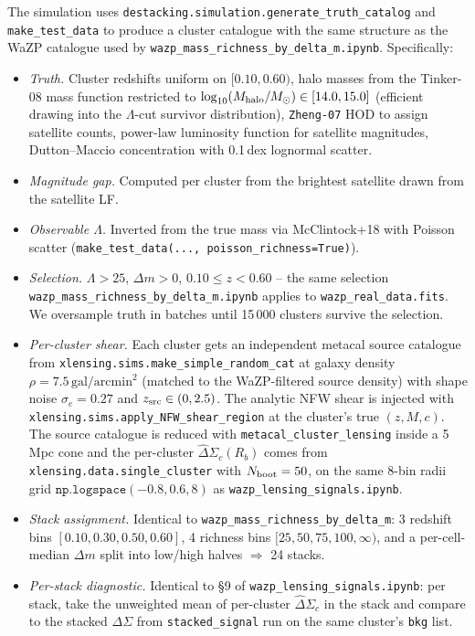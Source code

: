 \documentclass[11pt,a4paper]{article}
\newcommand{\DS}{\Delta\Sigma}
\newcommand{\Msun}{M_{\odot}}
\begin{document}
The simulation uses \verb|destacking.simulation.generate_truth_catalog|
and \verb|make_test_data| to produce a cluster catalogue with the same
structure as the WaZP catalogue used by
\verb|wazp_mass_richness_by_delta_m.ipynb|.  Specifically:
\begin{itemize}
\item \emph{Truth.}  Cluster redshifts uniform on $[0.10, 0.60)$,
      halo masses from the Tinker-08 mass function restricted to
      $\log_{10}(M_{\rm halo}/\Msun) \in [14.0, 15.0]$ (efficient
      drawing into the $\Lambda$-cut survivor distribution),
      \texttt{Zheng-07} HOD to assign satellite counts,
      power-law luminosity function for satellite magnitudes,
      Dutton--Maccio concentration with 0.1\,dex lognormal scatter.
\item \emph{Magnitude gap.}  Computed per cluster from the brightest
      satellite drawn from the satellite LF.
\item \emph{Observable $\Lambda$.}  Inverted from the true mass via
      McClintock+18 with Poisson scatter
      (\verb|make_test_data(..., poisson_richness=True)|).
\item \emph{Selection.}  $\Lambda > 25$, $\Delta m > 0$,
      $0.10 \le z < 0.60$ -- the same selection
      \verb|wazp_mass_richness_by_delta_m.ipynb| applies to
      \verb|wazp_real_data.fits|.  We oversample truth in batches
      until 15\,000 clusters survive the selection.
\item \emph{Per-cluster shear.}  Each cluster gets an independent
      metacal source catalogue from
      \verb|xlensing.sims.make_simple_random_cat| at galaxy density
      $\rho = 7.5\,\mathrm{gal}/\mathrm{arcmin}^{2}$ (matched to the
      WaZP-filtered source density) with shape noise $\sigma_e = 0.27$
      and $z_{\rm src} \in (0, 2.5)$.  The analytic NFW shear is
      injected with
      \verb|xlensing.sims.apply_NFW_shear_region| at the cluster's
      true $(z, M, c)$.  The source catalogue is reduced with
      \verb|metacal_cluster_lensing| inside a 5\,Mpc cone and the
      per-cluster $\widehat\DS_c(R_b)$ comes from
      \verb|xlensing.data.single_cluster| with
      $N_{\rm boot} = 50$, on the same 8-bin radii grid
      $\mathtt{np.logspace}(-0.8, 0.6, 8)$ as
      \verb|wazp_lensing_signals.ipynb|.
\item \emph{Stack assignment.}  Identical to
      \verb|wazp_mass_richness_by_delta_m|: 3 redshift bins
      $[0.10, 0.30, 0.50, 0.60]$, 4 richness bins
      $[25, 50, 75, 100, \infty)$, and a per-cell-median $\Delta m$ split
      into low/high halves $\Rightarrow$ 24 stacks.
\item \emph{Per-stack diagnostic.}  Identical to §9 of
      \verb|wazp_lensing_signals.ipynb|: per stack, take the
      unweighted mean of per-cluster $\widehat\DS_c$ in the stack and
      compare to the stacked $\DS$ from \verb|stacked_signal| run on
      the same cluster's \verb|bkg| list.
\end{itemize}
\end{document}
